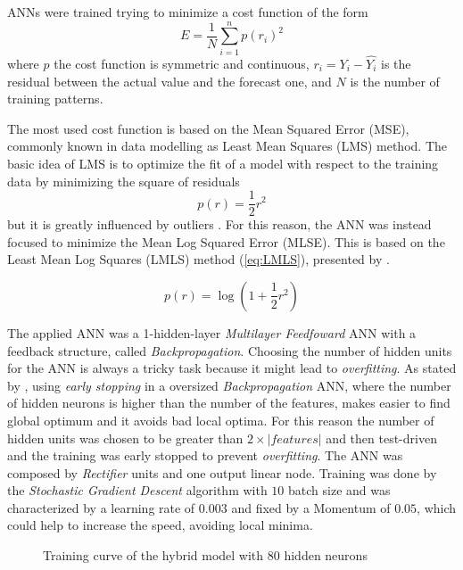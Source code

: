 \documentclass{sig-alternate-sigmod07}
\begin{document}
ANNs were trained trying to minimize a cost function of the form
\begin{displaymath}E= \frac{1}{N}\sum_{i=1}^np(r_i)^2\end{displaymath}
where $p$ the cost function is symmetric and continuous, $r_i = Y_i - \hat{Y_i}$ is the residual between the actual value and the forecast one, and $N$ is the number of training patterns.

The most used cost function is based on the Mean Squared Error (MSE), commonly known in data modelling as Least Mean Squares (LMS) method. The basic idea of LMS is to optimize the fit of a model with respect to the training data by minimizing the square of residuals
\begin{displaymath}p(r)= \frac{1}{2}r^2\end{displaymath}
but it is greatly influenced by outliers \cite{liano1996robust}. For this reason, the ANN was instead focused to minimize the Mean Log Squared Error (MLSE). This is based on the Least Mean Log Squares (LMLS) method  (\cref{eq:LMLS}), presented by \cite{liano1996robust}.

\begin{equation}
p(r) = \log(1 + \frac{1}{2}r^2)
\label{eq:LMLS}
\end{equation}

The applied ANN was a 1-hidden-layer \emph{Multilayer Feedfoward} ANN with a feedback structure, called \textit{Backpropagation}. Choosing the number of hidden units for the ANN is always a tricky task because it might lead to \emph{overfitting}. As stated by \cite{lawrence1998size, sarle1995stopped}, using \emph{early stopping} in a oversized \emph{Backpropagation} ANN, where the number of hidden neurons is higher than the number of the features, makes easier to find global optimum and it avoids bad local optima. For this reason the number of hidden units was chosen to be greater than $2\times |features|$ and then test-driven and the training was early stopped to prevent \emph{overfitting}. The ANN was composed by \emph{Rectifier} units and one output linear node. Training was done by the \emph{Stochastic Gradient Descent} algorithm with $10$ batch size and was characterized by a learning rate of $0.003$ and fixed by a Momentum of $0.05$, which could help to increase the speed, avoiding local minima.

\begin{figure}
\centering
{}
\caption{Training curve of the hybrid model with 80 hidden neurons}
\end{figure}
\end{document}
